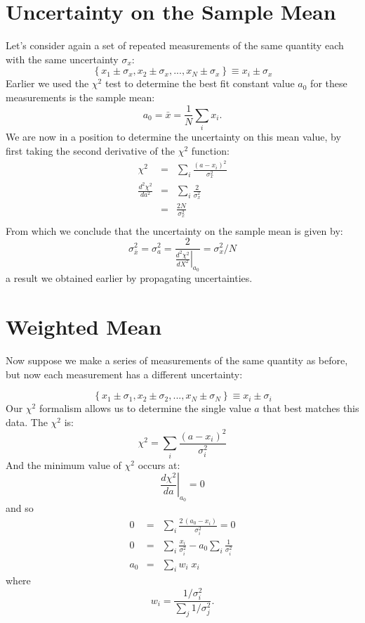 \documentclass[12pt,oneside]{book}
\begin{document}
\section{Uncertainty on the Sample Mean}
Let's consider again a set of repeated measurements of the same quantity
each with the same uncertainty $\sigma_x$:
\begin{displaymath}
\left\{ x_1 \pm \sigma_x, x_2 \pm \sigma_x, ..., x_N \pm \sigma_x \right\} \equiv x_i \pm \sigma_x
\end{displaymath}
Earlier we used the $\chi^2$ test to determine the best fit constant
value $a_0$ for these measurements is the sample mean:
\begin{displaymath}
a_0 = \bar{x} = \frac{1}{N} \sum_i x_i \label{eqn:mean}.
\end{displaymath}
We are now in a position to determine the uncertainty on this mean
value, by first taking the second derivative of the $\chi^2$ function:
\begin{eqnarray*}
\chi^2 &=& \sum_i \frac{(a-x_i)^2}{\sigma_x^2} \\
\frac{d^2\chi^2}{da^2} &=& \sum_i \frac{2}{\sigma_x^2}\\
&=& \frac{2 N}{\sigma_x^2}\\
\end{eqnarray*}
From which we conclude that the uncertainty on the sample mean is given by:
\begin{displaymath}
\sigma^2_{\bar{x}} = \sigma^2_a = \frac{2}{\left. \frac{d^2\chi^2}{dX^2} \right|_{a_0}} = \sigma_x^2 / N
\end{displaymath}
a result we obtained earlier by propagating uncertainties.

\section{Weighted Mean}

Now suppose we make a series of measurements of the same quantity as
before, but now each measurement has a different uncertainty:

\begin{displaymath}
\left\{ x_1 \pm \sigma_1, x_2 \pm \sigma_2, ..., x_N \pm \sigma_N \right\} \equiv x_i \pm \sigma_i
\end{displaymath}
Our $\chi^2$ formalism allows us to determine the single value $a$ that best matches this data.  The $\chi^2$ is:
\begin{displaymath}
\chi^2 = \sum_i \frac{(a-x_i)^2}{\sigma_i^2}
\end{displaymath}
And the minimum value of $\chi^2$ occurs at:
\begin{displaymath}
\left.\frac{d\chi^2}{da}\right|_{a_0} = 0
\end{displaymath}
and so
\begin{eqnarray*}
0 &=& \sum_i \frac{2\,(a_0 - x_i)}{\sigma_i^2} = 0\\
0 &=& \sum_i \frac{x_i}{\sigma^2_i} - a_0 \sum_i \frac{1}{\sigma^2_i}\\
a_0 &=& \sum_i w_i \; x_i
\end{eqnarray*}
where
\begin{equation}
w_i = \frac{1/\sigma^2_i}{\sum_j 1/\sigma_j^2}.
\end{equation}
\end{document}
